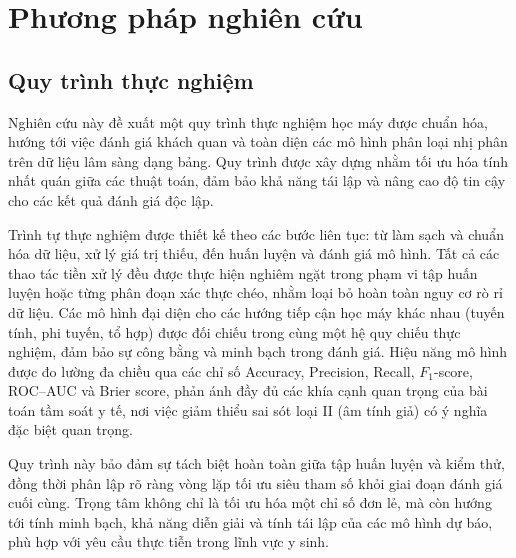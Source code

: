 \documentclass[14pt,a4paper]{extreport}
\begin{document}
\chapter{Phương pháp nghiên cứu}
\label{sec:methods}

\section{Quy trình thực nghiệm}


Nghiên cứu này đề xuất một quy trình thực nghiệm học máy được chuẩn hóa, hướng tới việc đánh giá khách quan và toàn diện các mô hình phân loại nhị phân trên dữ liệu lâm sàng dạng bảng. Quy trình được xây dựng nhằm tối ưu hóa tính nhất quán giữa các thuật toán, đảm bảo khả năng tái lập và nâng cao độ tin cậy cho các kết quả đánh giá độc lập. 

Trình tự thực nghiệm được thiết kế theo các bước liên tục: từ làm sạch và chuẩn hóa dữ liệu, xử lý giá trị thiếu, đến huấn luyện và đánh giá mô hình. Tất cả các thao tác tiền xử lý đều được thực hiện nghiêm ngặt trong phạm vi tập huấn luyện hoặc từng phân đoạn xác thực chéo, nhằm loại bỏ hoàn toàn nguy cơ rò rỉ dữ liệu. Các mô hình đại diện cho các hướng tiếp cận học máy khác nhau (tuyến tính, phi tuyến, tổ hợp) được đối chiếu trong cùng một hệ quy chiếu thực nghiệm, đảm bảo sự công bằng và minh bạch trong đánh giá. Hiệu năng mô hình được đo lường đa chiều qua các chỉ số Accuracy, Precision, Recall, $F_1$-score, ROC--AUC và Brier score, phản ánh đầy đủ các khía cạnh quan trọng của bài toán tầm soát y tế, nơi việc giảm thiểu sai sót loại II (âm tính giả) có ý nghĩa đặc biệt quan trọng.

Quy trình này bảo đảm sự tách biệt hoàn toàn giữa tập huấn luyện và kiểm thử, đồng thời phân lập rõ ràng vòng lặp tối ưu siêu tham số khỏi giai đoạn đánh giá cuối cùng. Trọng tâm không chỉ là tối ưu hóa một chỉ số đơn lẻ, mà còn hướng tới tính minh bạch, khả năng diễn giải và tính tái lập của các mô hình dự báo, phù hợp với yêu cầu thực tiễn trong lĩnh vực y sinh.
\end{document}
